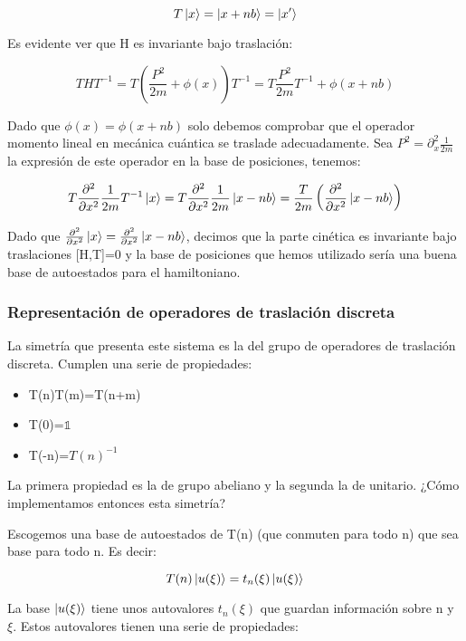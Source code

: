 $$T\ket{x}=\ket{x+nb}=\ket{x'}$$

Es evidente ver que H es invariante bajo traslación:

$$THT^{-1}=T\left( \frac{P^2}{2m}+\phi (x)\right)T^{-1}=T \frac{P^2}{2m}T^{-1}+\phi (x+nb)$$

Dado que $\phi (x)=\phi (x+nb)$ solo debemos comprobar que el operador momento lineal en mecánica cuántica se traslade adecuadamente. Sea $P^2=\partial ^2_x\frac{1}{2m}$ la expresión de este operador en la base de posiciones, tenemos:

$$T\frac{\partial ^2}{\partial x^2}\frac{1}{2m}T^{-1}\ket{x}=T\frac{\partial ^2}{\partial x^2}\frac{1}{2m}\ket{x-nb}=\frac{T}{2m}\left ( \frac{\partial ^2}{\partial x^2}\ket{x-nb}\right)$$

Dado que $\frac{\partial ^2}{\partial x^2}\ket{x}=\frac{\partial ^2}{\partial x^2}\ket{x-nb}$, decimos que la parte cinética es invariante bajo traslaciones [H,T]=0 y la base de posiciones que hemos utilizado sería una buena base de autoestados para el hamiltoniano.

\newpage
\subsubsection{Representación de operadores de traslación discreta}
La simetría que presenta este sistema es la del grupo de operadores de traslación discreta. Cumplen una serie de propiedades:

\begin{itemize}

\item T(n)T(m)=T(n+m)

\item T(0)=$\mathds{1}$

\item T(-n)=$T(n)^{-1}$

\end{itemize}

La primera propiedad es la de grupo abeliano y la segunda la de unitario. ¿Cómo implementamos entonces esta simetría?

Escogemos una base de autoestados de T(n) (que conmuten para todo n) que sea base para todo n. Es decir:

$$T(n) \ket{u(\xi)}=t_n(\xi)\ket{u(\xi)}$$

La base $\ket{u(\xi)}$ tiene unos autovalores $t_n(\xi)$ que guardan información sobre n y $\xi$. Estos autovalores tienen una serie de propiedades:

